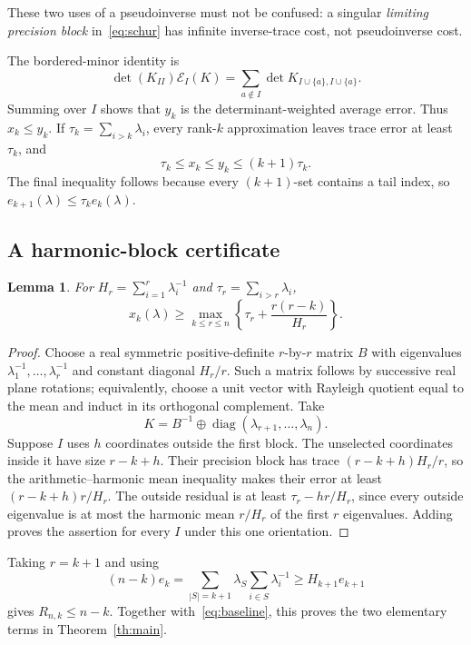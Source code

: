 \documentclass[11pt]{article}
\newtheorem{lemma}[theorem]{Lemma}
\theoremstyle{remark}\newtheorem{remark}[theorem]{Remark}
\newcommand{\diag}{\operatorname{diag}}
\newcommand{\Err}{\mathcal E}
\begin{document}
These two uses of a pseudoinverse must not be confused: a singular \emph{limiting precision block} in~\eqref{eq:schur} has infinite inverse-trace cost, not pseudoinverse cost.

The bordered-minor identity is
\[
 \det(K_{II})\Err_I(K)
 =\sum_{a\notin I}\det K_{I\cup\{a\},I\cup\{a\}}.
\]
Summing over $I$ shows that $y_k$ is the determinant-weighted average error. Thus $x_k\le y_k$. If $\tau_k=\sum_{i>k}\lambda_i$, every rank-$k$ approximation leaves trace error at least $\tau_k$, and
\begin{equation}\label{eq:baseline}
 \tau_k\le x_k\le y_k\le(k+1)\tau_k.
\end{equation}
The final inequality follows because every $(k+1)$-set contains a tail index, so $e_{k+1}(\lambda)\le \tau_k e_k(\lambda)$.

\subsection{A harmonic-block certificate}
\begin{lemma}\label{le:harmonic}
For $H_r=\sum_{i=1}^r\lambda_i^{-1}$ and $\tau_r=\sum_{i>r}\lambda_i$,
\[
 x_k(\lambda)\ge
 \max_{k\le r\le n}\left\{\tau_r+\frac{r(r-k)}{H_r}\right\}.
\]
\end{lemma}
\begin{proof}
Choose a real symmetric positive-definite $r$-by-$r$ matrix $B$ with eigenvalues $\lambda_1^{-1},\ldots,\lambda_r^{-1}$ and constant diagonal $H_r/r$. Such a matrix follows by successive real plane rotations; equivalently, choose a unit vector with Rayleigh quotient equal to the mean and induct in its orthogonal complement. Take
\[
 K=B^{-1}\oplus\diag(\lambda_{r+1},\ldots,\lambda_n).
\]
Suppose $I$ uses $h$ coordinates outside the first block. The unselected coordinates inside it have size $r-k+h$. Their precision block has trace $(r-k+h)H_r/r$, so the arithmetic--harmonic mean inequality makes their error at least $(r-k+h)r/H_r$. The outside residual is at least $\tau_r-h r/H_r$, since every outside eigenvalue is at most the harmonic mean $r/H_r$ of the first $r$ eigenvalues. Adding proves the assertion for every $I$ under this one orientation.
\end{proof}
Taking $r=k+1$ and using
\[
 (n-k)e_k
 =\sum_{|S|=k+1}\lambda_S\sum_{i\in S}\lambda_i^{-1}
 \ge H_{k+1}e_{k+1}
\]
gives $R_{n,k}\le n-k$. Together with~\eqref{eq:baseline}, this proves the two elementary terms in Theorem~\ref{th:main}.
\end{document}
